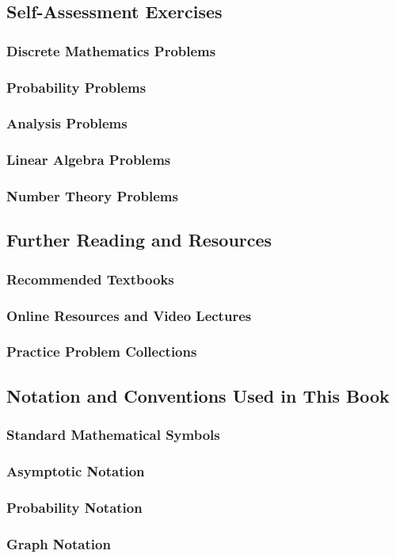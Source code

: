 \subsection{Self-Assessment Exercises}
\label{subsec:exercises}

\subsubsection{Discrete Mathematics Problems}
\subsubsection{Probability Problems}
\subsubsection{Analysis Problems}
\subsubsection{Linear Algebra Problems}
\subsubsection{Number Theory Problems}

\subsection{Further Reading and Resources}
\label{subsec:resources}

\subsubsection{Recommended Textbooks}
\subsubsection{Online Resources and Video Lectures}
\subsubsection{Practice Problem Collections}

\subsection{Notation and Conventions Used in This Book}
\label{subsec:notation}

\subsubsection{Standard Mathematical Symbols}
\subsubsection{Asymptotic Notation}
\subsubsection{Probability Notation}
\subsubsection{Graph Notation}